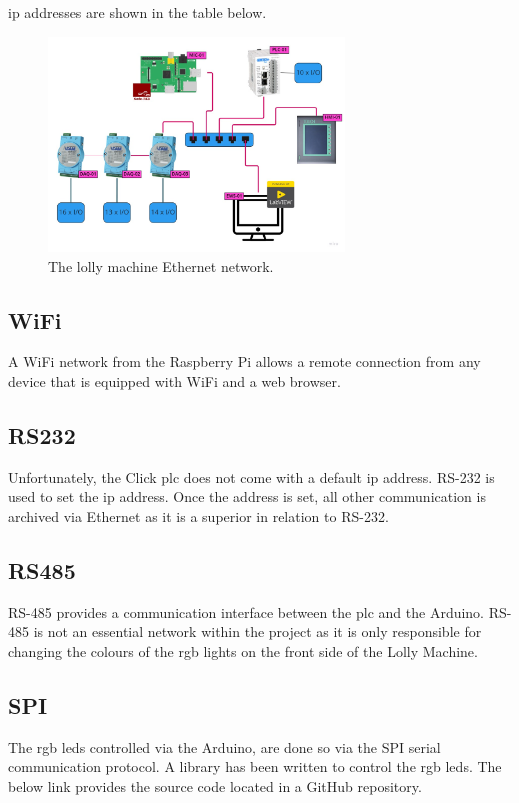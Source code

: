     \acrshort{ip} addresses are shown in the table below.	

        \begin{figure}[H]
            \centering
            \includegraphics[width = 0.7\textwidth]{2_images/ethernetLollyMachine.png}
            \caption{The lolly machine Ethernet network.}
            \label{fig:ethernetLollyMachine}
        \end{figure}
    
    \subsection{WiFi}
    A WiFi network from the Raspberry Pi allows a remote connection from any device that is equipped with WiFi and a web browser. 
    
    \subsection{RS232}
    Unfortunately, the Click \acrshort{plc} does not come with a default \acrshort{ip} address. RS-232 is used to set the \acrshort{ip} address. Once the address is set, all other communication is archived via Ethernet as it is a superior in relation to RS-232.
    
    \subsection{RS485}
    RS-485 provides a communication interface between the \acrshort{plc} and the Arduino. RS-485 is not an essential network within the project as it is only responsible for changing the colours of the \acrshort{rgb} lights on the front side of the Lolly Machine.
    
    \subsection{SPI}
    The \acrshort{rgb} \acrshort{led}s controlled via the Arduino, are done so via the SPI serial communication protocol. A library has been written to control the \acrshort{rgb} \acrshort{led}s. The below link provides the source code located in a GitHub repository.
    
